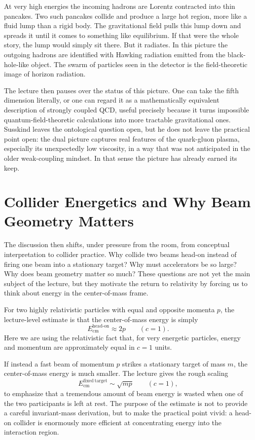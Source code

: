 At very high energies the incoming hadrons are Lorentz contracted into thin pancakes. Two such pancakes collide and produce a large hot region, more like a fluid lump than a rigid body. The gravitational field pulls this lump down and spreads it until it comes to something like equilibrium. If that were the whole story, the lump would simply sit there. But it radiates. In this picture the outgoing hadrons are identified with Hawking radiation emitted from the black-hole-like object. The swarm of particles seen in the detector is the field-theoretic image of horizon radiation.

The lecture then pauses over the status of this picture. One can take the fifth dimension literally, or one can regard it as a mathematically equivalent description of strongly coupled QCD, useful precisely because it turns impossible quantum-field-theoretic calculations into more tractable gravitational ones. Susskind leaves the ontological question open, but he does not leave the practical point open: the dual picture captures real features of the quark-gluon plasma, especially its unexpectedly low viscosity, in a way that was not anticipated in the older weak-coupling mindset. In that sense the picture has already earned its keep.

\section{Collider Energetics and Why Beam Geometry Matters}

The discussion then shifts, under pressure from the room, from conceptual interpretation to collider practice. Why collide two beams head-on instead of firing one beam into a stationary target? Why must accelerators be so large? Why does beam geometry matter so much? These questions are not yet the main subject of the lecture, but they motivate the return to relativity by forcing us to think about energy in the center-of-mass frame.

For two highly relativistic particles with equal and opposite momenta \(p\), the lecture-level estimate is that the center-of-mass energy is simply
\begin{equation}
E_{\mathrm{cm}}^{\mathrm{head\text{-}on}} \approx 2p
\qquad (c=1).
\end{equation}
Here we are using the relativistic fact that, for very energetic particles, energy and momentum are approximately equal in \(c=1\) units.

If instead a fast beam of momentum \(p\) strikes a stationary target of mass \(m\), the center-of-mass energy is much smaller. The lecture gives the rough scaling
\begin{equation}
E_{\mathrm{cm}}^{\mathrm{fixed\ target}} \sim \sqrt{mp}
\qquad (c=1),
\end{equation}
to emphasize that a tremendous amount of beam energy is wasted when one of the two participants is left at rest. The purpose of the estimate is not to provide a careful invariant-mass derivation, but to make the practical point vivid: a head-on collider is enormously more efficient at concentrating energy into the interaction region.

